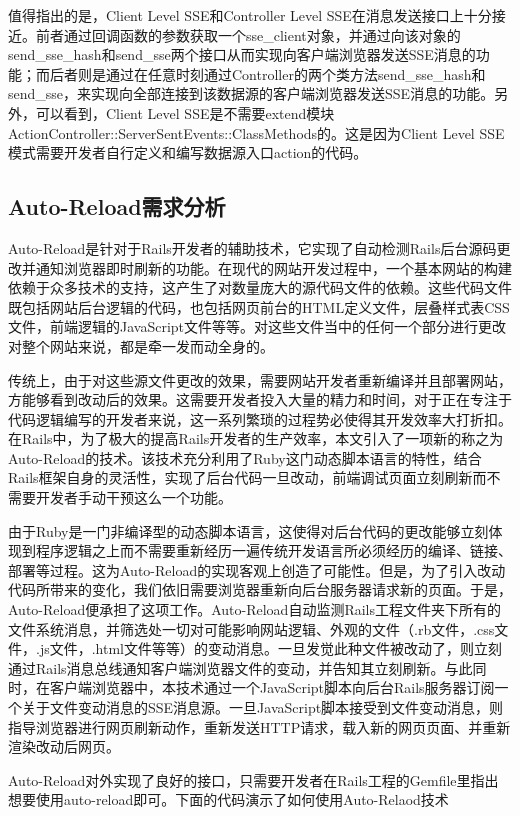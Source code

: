 值得指出的是，Client Level SSE和Controller Level SSE在消息发送接口上十分接近。前者通过回调函数的参数获取一个sse\_client对象，并通过向该对象的send\_sse\_hash和send\_sse两个接口从而实现向客户端浏览器发送SSE消息的功能；而后者则是通过在任意时刻通过Controller的两个类方法send\_sse\_hash和send\_sse，来实现向全部连接到该数据源的客户端浏览器发送SSE消息的功能。另外，可以看到，Client Level SSE是不需要extend模块ActionController::ServerSentEvents::ClassMethods的。这是因为Client Level SSE模式需要开发者自行定义和编写数据源入口action的代码。

\subsection{Auto-Reload需求分析}
Auto-Reload是针对于Rails开发者的辅助技术，它实现了自动检测Rails后台源码更改并通知浏览器即时刷新的功能。在现代的网站开发过程中，一个基本网站的构建依赖于众多技术的支持，这产生了对数量庞大的源代码文件的依赖。这些代码文件既包括网站后台逻辑的代码，也包括网页前台的HTML定义文件，层叠样式表CSS文件，前端逻辑的JavaScript文件等等。对这些文件当中的任何一个部分进行更改对整个网站来说，都是牵一发而动全身的。

传统上，由于对这些源文件更改的效果，需要网站开发者重新编译并且部署网站，方能够看到改动后的效果。这需要开发者投入大量的精力和时间，对于正在专注于代码逻辑编写的开发者来说，这一系列繁琐的过程势必使得其开发效率大打折扣。在Rails中，为了极大的提高Rails开发者的生产效率，本文引入了一项新的称之为Auto-Reload的技术。该技术充分利用了Ruby这门动态脚本语言的特性，结合Rails框架自身的灵活性，实现了后台代码一旦改动，前端调试页面立刻刷新而不需要开发者手动干预这么一个功能。

由于Ruby是一门非编译型的动态脚本语言，这使得对后台代码的更改能够立刻体现到程序逻辑之上而不需要重新经历一遍传统开发语言所必须经历的编译、链接、部署等过程。这为Auto-Reload的实现客观上创造了可能性。但是，为了引入改动代码所带来的变化，我们依旧需要浏览器重新向后台服务器请求新的页面。于是，Auto-Reload便承担了这项工作。Auto-Reload自动监测Rails工程文件夹下所有的文件系统消息，并筛选处一切对可能影响网站逻辑、外观的文件（.rb文件，.css文件，.js文件，.html文件等等）的变动消息。一旦发觉此种文件被改动了，则立刻通过Rails消息总线通知客户端浏览器文件的变动，并告知其立刻刷新。与此同时，在客户端浏览器中，本技术通过一个JavaScript脚本向后台Rails服务器订阅一个关于文件变动消息的SSE消息源。一旦JavaScript脚本接受到文件变动消息，则指导浏览器进行网页刷新动作，重新发送HTTP请求，载入新的网页页面、并重新渲染改动后网页。

Auto-Reload对外实现了良好的接口，只需要开发者在Rails工程的Gemfile里指出想要使用auto-reload即可。下面的代码演示了如何使用Auto-Relaod技术

